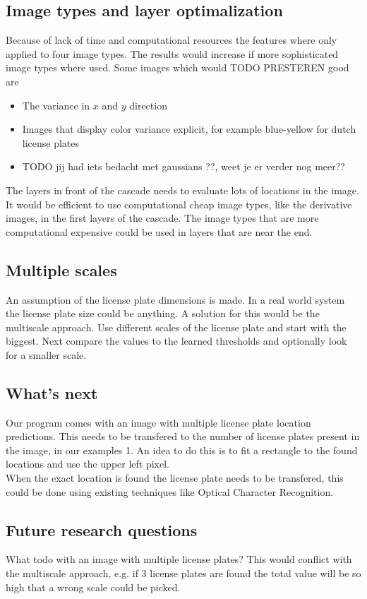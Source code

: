 \documentclass[a4paper,11pt]{article}
\begin{document}
\subsection{Image types and layer optimalization} 
Because of lack of time and computational resources the features where only
applied to four image types. The results would increase if more sophisticated
image types where used. Some images which would TODO PRESTEREN good are
\begin{itemize}
	\item{The variance in $x$ and $y$ direction}
	\item{Images that display color variance explicit, for example blue-yellow for dutch license plates}
	\item{TODO jij had iets bedacht met gaussians ??, weet je er verder nog meer??}
\end{itemize}

The layers in front of the cascade needs to evaluate lots of locations in the
image.  It would be efficient to use computational cheap image types, like the
derivative images, in the first layers of the cascade.  The image types that
are more computational expensive could be used in layers that are near the end.

\subsection{Multiple scales} 
An assumption of the license plate dimensions is made. In a real world system
the license plate size could be anything. A solution for this would be the
multiscale approach. Use different scales of the license plate and start with
the biggest. Next compare the values to the learned thresholds and optionally
look for a smaller scale.


\subsection{What's next} 
Our program comes with an image with multiple license plate location
predictions. This needs to be transfered to the number of license plates
present in the image, in our examples 1. An idea to do this is to fit a
rectangle to the found locations and use the upper left pixel.\\
When the exact location is found the license plate needs to be transfered, this
could be done using existing techniques like Optical Character Recognition.

\subsection{Future research questions} 
What todo with an image with multiple license plates? This would conflict with
the multiscale approach, e.g. if 3 license plates are found the total value
will be so high that a wrong scale could be picked.


\newpage
\renewcommand\bibname{References}


\end{document}
